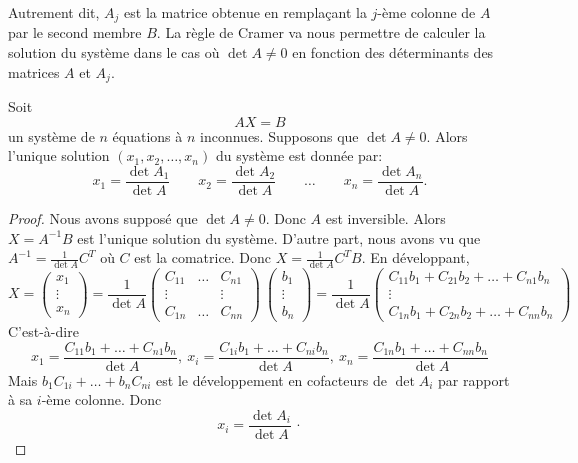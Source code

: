 \documentclass[class=report,crop=false]{standalone}
\begin{document}
Autrement dit, $A_j$ est la matrice obtenue en remplaçant la $j$-ème
colonne de $A$ par le second membre $B$. La règle de Cramer va nous
permettre de calculer la solution du système dans le cas où
$\det A \neq 0$ en fonction des déterminants des matrices $A$ et
$A_j$.

\begin{theoreme} Soit $$
AX = B
$$
un système de $n$ équations  à $n$ inconnues. Supposons que $\det A \neq 0$.
Alors l'unique solution $(x_1,x_2,\ldots,x_n)$ du système est donnée par:
$$
x_1 = \frac{\det A_1}{\det A} \qquad x_2 = \frac{\det A_2}{\det A} \qquad \ldots \qquad x_n = \frac{\det A_n}{\det A}.
$$
\end{theoreme}

\begin{proof}
Nous avons supposé que $\det A \neq 0$. Donc $A$ est inversible. Alors
$X = A^{-1} B$ est l'unique solution du système. D'autre part, nous avons vu que
$A^{-1} = \frac{1}{\det A} C^T$ où $C$ est la comatrice.
Donc $X = \frac{1}{\det A} C^T B$.
En développant,
\[
X =
\begin{pmatrix}
x_1\\
\vdots\\
x_n
\end{pmatrix}
= \frac{1}{\det A}
\begin{pmatrix}
C_{11} & \dots & C_{n1}\\
\vdots && \vdots\\
C_{1n} &\dots & C_{nn}
\end{pmatrix}
\
\begin{pmatrix}
b_1\\
\vdots\\
b_n
\end{pmatrix}
=  \frac{1}{\det A}
\begin{pmatrix}
C_{11} b_1 + C_{21} b_2 + \dots + C_{n1} b_n\\
\vdots\\
C_{1n}b_1 + C_{2n} b_2 + \dots + C_{nn} b_n
\end{pmatrix}
\]
C'est-à-dire
\[
x_1  =  \frac{C_{11} b_1 + \dots + C_{n1} b_n}{\det A}
,\ 
x_i  =  \frac{C_{1i}b_1 + \dots + C_{ni} b_n}{\det A}
,\ 
x_n = \frac{C_{1n}b_1 + \dots + C_{nn} b_n}{\det A}
\]
Mais $b_1 C_{1i} + \dots + b_n C_{ni}$
est le développement en cofacteurs de
$\det A_i$ par rapport à sa $i$-ème colonne.  Donc
\[
x_i = \frac{\det A_i}{\det A}\, \cdotp
\]
\end{proof}
%
\end{document}
